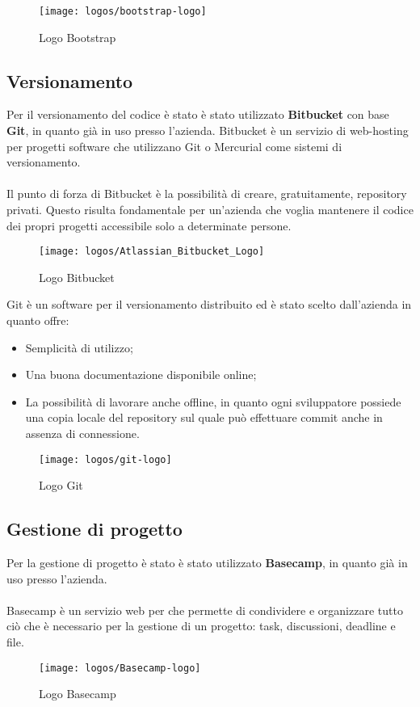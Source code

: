 \begin{figure}[htbp]
\begin{center}
\texttt{[image: logos/bootstrap-logo]}
\caption{Logo Bootstrap}
\end{center}
\end{figure}

\subsection{Versionamento}
Per il versionamento del codice è stato è stato utilizzato \textbf{Bitbucket} con base \textbf{Git}, in quanto già in uso presso l'azienda.
Bitbucket è un servizio di web-hosting per progetti software che utilizzano Git o Mercurial come sistemi di versionamento.
\\ \\
Il punto di forza di Bitbucket è la possibilità di creare, gratuitamente, repository privati. Questo risulta fondamentale per un'azienda che voglia mantenere il codice dei propri progetti accessibile solo a determinate persone.

\begin{figure}[htbp]
\begin{center}
\texttt{[image: logos/Atlassian\_Bitbucket\_Logo]}
\caption{Logo Bitbucket}
\end{center}
\end{figure}

Git è un software per il versionamento distribuito ed è stato scelto dall'azienda in quanto offre:
\begin{itemize}
	\item Semplicità di utilizzo;
	\item Una buona documentazione disponibile online;
	\item La possibilità di lavorare anche offline, in quanto ogni sviluppatore possiede una copia locale del repository sul quale può effettuare commit anche in assenza di connessione. 
\end{itemize} 

\begin{figure}[htbp]
\begin{center}
\texttt{[image: logos/git-logo]}
\caption{Logo Git}
\end{center}
\end{figure}

\subsection{Gestione di progetto}
Per la gestione di progetto è stato è stato utilizzato \textbf{Basecamp}, in quanto già in uso presso l'azienda.
\\ \\
Basecamp è un servizio web per che permette di condividere e organizzare tutto ciò che è necessario per la gestione di un progetto: task, discussioni, deadline e file.

\begin{figure}[htbp]
\begin{center}
\texttt{[image: logos/Basecamp-logo]}
\caption{Logo Basecamp}
\end{center}
\end{figure}